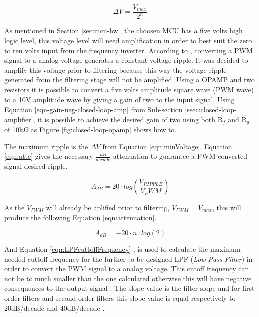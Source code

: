 			\begin{equation}\label{eqn:minVoltage}
				\Delta V=\frac{V_{max}}{2^{n}}
			\end{equation}
	
		As mentioned in Section \ref{sec:mcu-hw}, the choosen MCU has a five volts high logic level, this voltage level will need amplification in order to best suit the zero to ten volts input from the frequency inverter. According to \cite{alter2008pwm}, converting a PWM signal to a analog voltage generates a constant voltage ripple. It was decided to amplify this voltage prior to filtering because this way the voltage ripple generated from the filtering stage will not be amplified. Using a OPAMP and two resistors it is possible to convert a five volts amplitude square wave (PWM wave) to a 10V amplitude wave by giving a gain of two to the input signal. Using Equation \ref{eqn-gain-neg-closed-loop-amp} from Sub-section \ref{ssec:closed-loop-amplifier}, it is possible to achieve the desired gain of two using both R$_{f}$ and R$_{g}$ of 10k$\Omega$ as Figure \ref{fig:closed-loop-opamp} shows how to.

		The maximum ripple is the $\Delta V$ from Equation \ref{eqn:minVoltage}. Equation \ref{eqn:atte} \cite{metivier2013pwm} gives the necessary $\frac{dB}{decade}$ attenuation to guarantee a PWM converted signal desired ripple.

	 		\begin{equation}\label{eqn:atte}
				A_{dB}=20\cdot log \left( \frac{V_{RIPPLE}}{V_PWM} \right) 
			\end{equation}
			
		As the $V_{PWM}$ will already be aplified prior to filtering, $V_{PWM}=V_{max}$, this will produce the following Equation \ref{eqn:attenuation}.
		
			\begin{equation}\label{eqn:attenuation}
				A_{dB}=-20 \cdot n \cdot log \left( 2 \right) 
			\end{equation}
	
		And Equation \ref{eqn:LPFcuttoffFrequency} \cite{metivier2013pwm}, is used to calculate the maximum needed cuttoff frequency for the further to be designed LPF (\textit{Low-Pass-Filter}) in order to convert the PWM signal to a analog voltage. This cutoff frequency can not be to much smaller than the one calculated otherwise this will have negative consequences to the output signal \cite{keim2016pwm}. The slope value is the filter slope and for first order filters and second order filters this slope value is equal respectively to 20dB/decade and 40dB/decade \cite{metivier2013pwm}.
	
